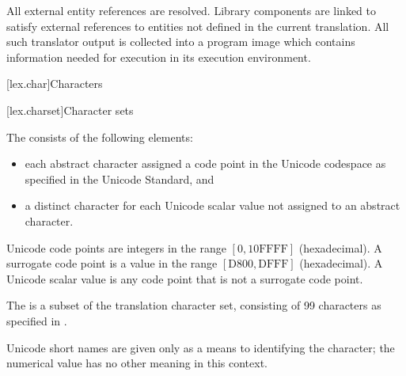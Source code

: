 \pnum
All external entity references are resolved. Library
components are linked to satisfy external references to
entities not defined in the current translation. All such translator
output is collected into a program image which contains information
needed for execution in its execution environment.%

[lex.char]{Characters}%

[lex.charset]{Character sets}

\pnum
{}%
The  consists of the following elements:
\begin{itemize}
\item
each abstract character assigned a code point in the Unicode codespace
as specified in the Unicode Standard, and
\item
a distinct character for each Unicode scalar value
not assigned to an abstract character.
\end{itemize}
\begin{note}
Unicode code points are integers
in the range $[0, \mathrm{10FFFF}]$ (hexadecimal).
A surrogate code point is a value
in the range $[\mathrm{D800}, \mathrm{DFFF}]$ (hexadecimal).
A Unicode scalar value is any code point that is not a surrogate code point.
\end{note}

\pnum
The  is a subset of the translation character set,
consisting of 99 characters as specified in .
\begin{note}
Unicode short names are given only as a means to identifying the character;
the numerical value has no other meaning in this context.
\end{note}

